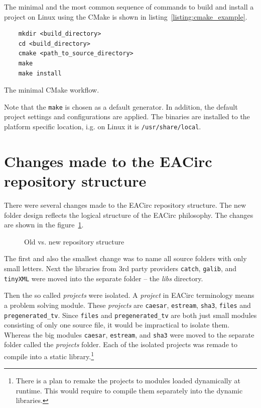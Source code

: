 \documentclass[12pt,twoside]{fithesis2}
\begin{document}
The minimal and the most common sequence of commands to build and install a project on Linux using the CMake is shown in listing~\ref{listing:cmake_example}.

\begin{listing}[h]
	\begin{verbatim}
	mkdir <build_directory>
	cd <build_directory>
	cmake <path_to_source_directory>
	make
	make install
	\end{verbatim}
	\caption{The minimal CMake workflow.}
	\label{listing:cmake_example}
\end{listing}

Note that the \texttt{make} is chosen as a default generator. In addition, the default project settings and configurations are applied. The binaries are installed to the platform specific location, i.g. on Linux it is \texttt{/usr/share/local}.

\section{Changes made to the EACirc repository structure}

There were several changes made to the EACirc repository structure. The new folder design reflects the logical structure of the EACirc philosophy. The changes are shown in the figure~\ref{fig:repository_changes}.

\begin{figure}[h]
	\centering
	
	\caption{Old vs. new repository structure}
	\label{fig:repository_changes}
\end{figure}

The first and also the smallest change was to name all source folders with only small letters. Next the libraries from 3rd party providers \texttt{catch}, \texttt{galib}, and \texttt{tinyXML} were moved into the separate folder -- the \emph{libs} directory.

Then the so called \emph{projects} were isolated. A \emph{project} in EACirc terminology means a problem solving module. These \emph{projects} are \texttt{caesar}, \texttt{estream}, \texttt{sha3}, \texttt{files} and \texttt{pregenerated\_tv}. Since \texttt{files} and \texttt{pregenerated\_tv} are both just small modules consisting of only one source file, it would be impractical to isolate them. Whereas the big modules \texttt{caesar}, \texttt{estream}, and \texttt{sha3} were moved to the separate folder called the \emph{projects} folder. Each of the isolated projects was remade to compile into a static library.\footnote{There is a plan to remake the projects to modules loaded dynamically at runtime. This would require to compile them separately into the dynamic libraries.}
\end{document}
